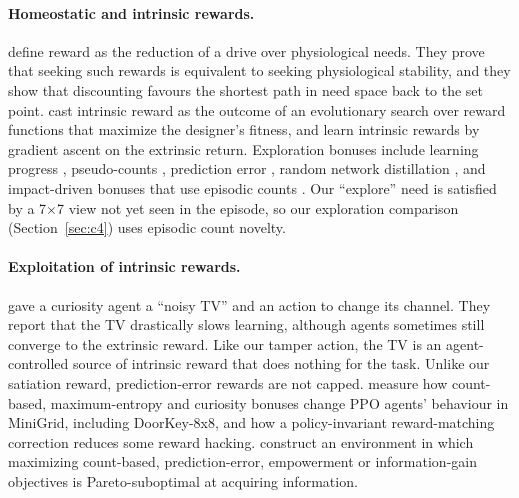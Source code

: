 \documentclass[11pt,letterpaper]{article}
\begin{document}
\paragraph{Homeostatic and intrinsic rewards.}
\citet{keramati2014homeostatic} define reward as the reduction of a drive over physiological needs. They prove that
seeking such rewards is equivalent to seeking physiological stability, and they show that discounting favours the
shortest path in need space back to the set point. \citet{singh2010intrinsically} cast intrinsic reward as the
outcome of an evolutionary search over reward functions that maximize the designer's fitness, and
\citet{zheng2018learning} learn intrinsic rewards by gradient ascent on the extrinsic return. Exploration bonuses
include learning progress \citep{oudeyer2007intrinsic}, pseudo-counts \citep{bellemare2016unifying}, prediction
error \citep{pathak2017curiosity,burda2019largescale}, random network distillation \citep{burda2019rnd}, and
impact-driven bonuses that use episodic counts \citep{raileanu2020ride}. Our ``explore'' need is satisfied by a
7$\times$7 view not yet seen in the episode, so our exploration comparison (Section~\ref{sec:c4}) uses episodic
count novelty.

\paragraph{Exploitation of intrinsic rewards.}
\citet{burda2019largescale} gave a curiosity agent a ``noisy TV'' and an action to change its channel. They report
that the TV drastically slows learning, although agents sometimes still converge to the extrinsic reward. Like our
tamper action, the TV is an agent-controlled source of intrinsic reward that does nothing for the task. Unlike our
satiation reward, prediction-error rewards are not capped. \citet{villalobos2025minding} measure how count-based,
maximum-entropy and curiosity bonuses change PPO agents' behaviour in MiniGrid, including DoorKey-8x8, and how a
policy-invariant reward-matching correction reduces some reward hacking. \citet{viteri2026intrinsic} construct an
environment in which maximizing count-based, prediction-error, empowerment or information-gain objectives is
Pareto-suboptimal at acquiring information.
\end{document}
